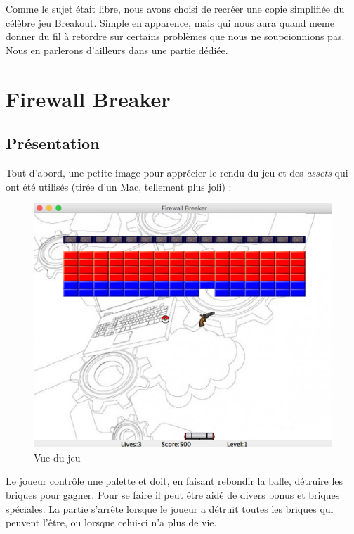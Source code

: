 \documentclass[a4paper,10pt]{article}
\begin{document}
Comme le sujet était libre, nous avons choisi de recréer une copie simplifiée du célèbre jeu Breakout.
Simple en apparence, mais qui nous aura quand meme donner du fil à retordre sur certains problèmes
que nous ne soupcionnions pas. Nous en parlerons d'ailleurs dans une partie dédiée.

\section{Firewall Breaker}
\subsection{Présentation}
    Tout d'abord, une petite image pour apprécier le rendu du jeu et des \textit{assets} qui ont été
    utilisés (tirée d'un Mac, tellement plus joli) :

\FloatBarrier
		\begin{figure}[!h]
    		\begin{center}
	   	  	\includegraphics[scale= 0.5]{images/gameView.png}
          	\caption{Vue du jeu}
    		\end{center}
		\end{figure}
\FloatBarrier

Le joueur contrôle une palette et doit, en faisant rebondir la balle, détruire les briques pour gagner.
Pour se faire il peut être aidé de divers bonus et briques spéciales. La partie s'arrête lorsque le joueur
a détruit toutes les briques qui peuvent l'être, ou lorsque celui-ci n'a plus de vie.
\end{document}
